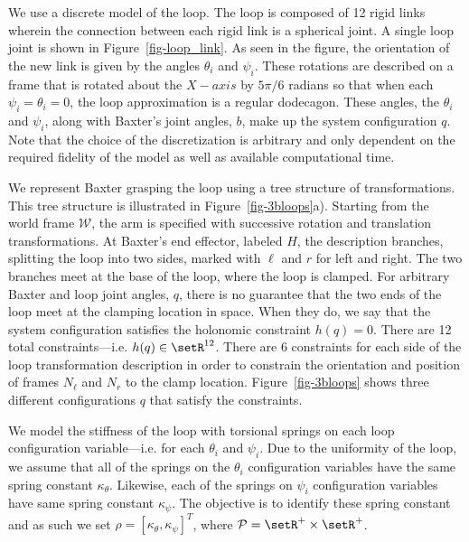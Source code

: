 \documentclass[letterpaper, 10pt, conference]{ieeeconf}
\begin{document}
We use a discrete model of the loop.  The loop is composed of 12 rigid links wherein the connection between each rigid link is a spherical joint.  A single loop joint is shown in Figure~\ref{fig-loop_link}.  As seen in the figure, the orientation of the new link is given by the angles $\theta_i$ and $\psi_i$.  These rotations are described on a frame that is rotated about the $X-axis$ by $5\pi/6$ radians so that when each $\psi_i = \theta_i = 0$, the loop approximation is a regular dodecagon.  These angles, the $\theta_i$ and $\psi_i$, along with Baxter's joint angles, $b$, make up the system configuration $q$. Note that the choice of the discretization is arbitrary and only dependent on the required fidelity of the model as well as available computational time. 

We represent Baxter grasping the loop using a tree structure of transformations.  This tree structure is illustrated in Figure~\ref{fig-3bloops}a).  Starting from the world frame $\mathcal{W}$, the arm is specified with successive rotation and translation transformations.  At Baxter's end effector, labeled $H$, the description branches, splitting the loop into two sides, marked with $\ell$ and $r$ for left and right.  The two branches meet at the base of the loop, where the loop is clamped.  For arbitrary Baxter and loop joint angles, $q$, there is no guarantee that the two ends of the loop meet at the clamping location in space.  When they do, we say that the system configuration satisfies the holonomic constraint $h(q) = 0$.  There are 12 total constraints---i.e. $h(q)\in\setR^{12}$.  There are 6 constraints for each side of the loop transformation description in order to constrain the orientation and position of frames $N_\ell$ and $N_r$ to the clamp location.  Figure~\ref{fig-3bloops} shows three different configurations $q$ that satisfy the constraints.

We model the stiffness of the loop with torsional springs on each loop configuration variable---i.e. for each $\theta_i$ and $\psi_i$.  Due to the uniformity of the loop, we assume that all of the springs on the $\theta_i$ configuration variables have the same spring constant $\kappa_{\theta}$.  Likewise, each of the springs on $\psi_i$ configuration variables have same spring constant $\kappa_{\psi}$.  The objective is to identify these spring constant and as such we set $\rho = [\kappa_{\theta}, \kappa_{\psi}]^T$, where $\mathcal{P} = \setR^+ \times \setR^+$.  
\end{document}
